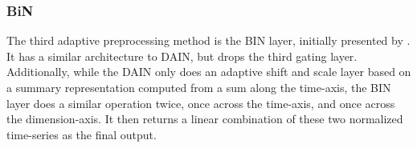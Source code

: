 \documentclass{statsmsc}
\begin{document}
{%



\subsubsection{BiN}%
\label{ssub:BiN}



The third adaptive preprocessing method is the \ac{BIN} layer, initially
presented by \cite{bin}. It has a similar architecture to \ac{DAIN}, but drops the
third gating layer. Additionally, while the \ac{DAIN} only does an adaptive shift and scale layer
based on a summary representation computed from a sum along the time-axis, the \ac{BIN} layer
does a similar operation twice, once across the time-axis, and once across the dimension-axis.
It then returns a linear combination of these two normalized time-series as the
final output.

}
\end{document}
